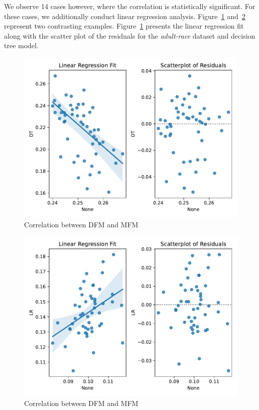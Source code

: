 \documentclass{article}
\begin{document}
We observe 14 cases however, where the correlation is statistically
significant. For these cases, we additionally conduct linear
regression analysis. Figure \ref{fig:scatterplot-dfm-mfm-adult-race}
and \ref{fig:scatterplot-dfm-mfm-compas-race} represent two
contrasting examples. Figure \ref{fig:scatterplot-dfm-mfm-adult-race}
presents the linear regression fit along with the scatter plot of the
residuals for the \emph{adult-race} dataset and decision tree model.


\begin{figure}
  \centering
  \includegraphics[width=0.95\linewidth]{scatterplot--dfm--mfm--adult-race.pdf}
  \caption{Correlation between DFM and MFM}
  \label{fig:scatterplot-dfm-mfm-adult-race}
\end{figure}

\begin{figure}
  \centering
  \includegraphics[width=0.95\linewidth]{scatterplot--dfm--mfm--compas-race.pdf}
  \caption{Correlation between DFM and MFM}
  \label{fig:scatterplot-dfm-mfm-compas-race}
\end{figure}
\end{document}
